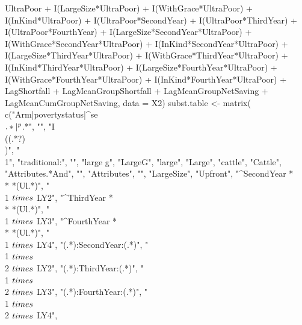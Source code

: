 \begin{Schunk}
\begin{Sinput}
  UltraPoor + 
  I(LargeSize*UltraPoor) + I(WithGrace*UltraPoor) + I(InKind*UltraPoor) + 
  I(UltraPoor*SecondYear) + I(UltraPoor*ThirdYear) + I(UltraPoor*FourthYear) +
  I(LargeSize*SecondYear*UltraPoor) + I(WithGrace*SecondYear*UltraPoor) + 
  I(InKind*SecondYear*UltraPoor) + 
  I(LargeSize*ThirdYear*UltraPoor) + I(WithGrace*ThirdYear*UltraPoor) + 
  I(InKind*ThirdYear*UltraPoor) + 
  I(LargeSize*FourthYear*UltraPoor) + I(WithGrace*FourthYear*UltraPoor) + 
  I(InKind*FourthYear*UltraPoor) + 
  LagShortfall + LagMeanGroupShortfall +
  LagMeanGroupNetSaving + LagMeanCumGroupNetSaving,
  data = X2)
subst.table <- matrix(
  c("Arm|povertystatus|^se\\$.*|^p\\$.*", "",
    "I\\((.*?)\\)", "\\1",
    "traditional:", "",
    "large g", "LargeG",
    "large", "Large",
    "cattle", "Cattle",
    "Attributes.*And", "",
    "Attributes", "",
    "LargeSize", "Upfront",
    "^SecondYear *\\* *(Ul.*)", "\\1 $\\\\times$ LY2",
    "^ThirdYear *\\* *(Ul.*)", "\\1 $\\\\times$ LY3",
    "^FourthYear *\\* *(Ul.*)", "\\1 $\\\\times$ LY4",
    "(.*):SecondYear:(.*)", "\\1 $\\\\times$ \\2 $\\\\times$ LY2",
    "(.*):ThirdYear:(.*)", "\\1 $\\\\times$ \\2 $\\\\times$ LY3",
    "(.*):FourthYear:(.*)", "\\1 $\\\\times$ \\2 $\\\\times$ LY4",

\end{Sinput}
\end{Schunk}
